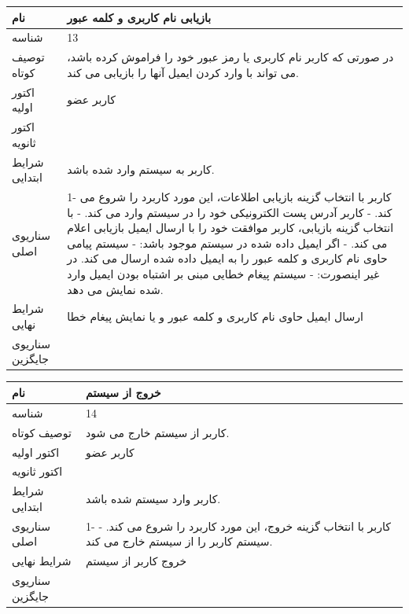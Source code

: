 \documentclass{article}
\begin{document}
\begin{tabular}{|p{2cm}|p{10cm}|}
\hline
نام
&
بازیابی نام کاربری و کلمه عبور
\\
\hline
شناسه
&
13
\\
\hline
توصیف کوتاه
&
در صورتی که کاربر نام کاربری یا رمز عبور خود را فراموش کرده باشد،  می تواند با وارد کردن ایمیل آنها را بازیابی می کند.
\\
\hline
اکتور اولیه
&
کاربر عضو
\\
\hline
اکتور ثانویه
&

\\
\hline
شرایط ابتدایی
&
کاربر به سیستم وارد شده باشد.
\\
\hline
سناریوی اصلی
&
1- کاربر با انتخاب گزینه بازیابی اطلاعات، این مورد کاربرد را شروع می کند.
\newline
2- کاربر آدرس پست الکترونیکی خود را در سیستم وارد می کند.
\newline
3- با انتخاب گزینه بازیابی، کاربر موافقت خود را با ارسال ایمیل بازیابی اعلام می کند.
\newline
4- اگر ایمیل داده شده در سیستم موجود باشد:
\newline
4.1- سیستم پیامی حاوی نام کاربری و کلمه عبور را به ایمیل داده شده ارسال می کند.
\newline
در غیر اینصورت:
\newline
4.2- سیستم پیغام خطایی مبنی بر اشتباه بودن ایمیل وارد شده نمایش می دهد.
\\
\hline
شرایط نهایی
&
ارسال ایمیل حاوی نام کاربری و کلمه عبور و یا نمایش پیغام خطا
\\
\hline
سناریوی جایگزین
&

\\
\hline
\end{tabular}

\vspace{2cm}

\begin{tabular}{|p{2cm}|p{10cm}|}
\hline
نام
&
خروج از سیستم
\\
\hline
شناسه
&
14
\\
\hline
توصیف کوتاه
&
کاربر از سیستم خارج می شود.
\\
\hline
اکتور اولیه
&
کاربر عضو
\\
\hline
اکتور ثانویه
&

\\
\hline
شرایط ابتدایی
&
کاربر وارد سیستم شده باشد.
\\
\hline
سناریوی اصلی
&
1- کاربر با انتخاب گزینه خروج، این مورد کاربرد را شروع می کند.
\newline
2- سیستم کاربر را از سیستم خارج می کند.
\\
\hline
شرایط نهایی
&
خروج کاربر از سیستم
\\
\hline
سناریوی جایگزین
&

\\
\hline
\end{tabular}
\end{document}
